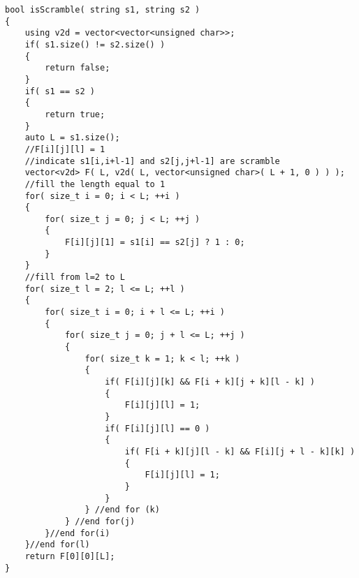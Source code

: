 \begin{lstlisting}[style=customc, caption={Dynamic Programming}]
bool isScramble( string s1, string s2 )
{
    using v2d = vector<vector<unsigned char>>;
    if( s1.size() != s2.size() )
    {
        return false;
    }
    if( s1 == s2 )
    {
        return true;
    }
    auto L = s1.size();
    //F[i][j][l] = 1
    //indicate s1[i,i+l-1] and s2[j,j+l-1] are scramble
    vector<v2d> F( L, v2d( L, vector<unsigned char>( L + 1, 0 ) ) );
    //fill the length equal to 1
    for( size_t i = 0; i < L; ++i )
    {
        for( size_t j = 0; j < L; ++j )
        {
            F[i][j][1] = s1[i] == s2[j] ? 1 : 0;
        }
    }
    //fill from l=2 to L
    for( size_t l = 2; l <= L; ++l )
    {
        for( size_t i = 0; i + l <= L; ++i )
        {
            for( size_t j = 0; j + l <= L; ++j )
            {
                for( size_t k = 1; k < l; ++k )
                {
                    if( F[i][j][k] && F[i + k][j + k][l - k] )
                    {
                        F[i][j][l] = 1;
                    }
                    if( F[i][j][l] == 0 )
                    {
                        if( F[i + k][j][l - k] && F[i][j + l - k][k] )
                        {
                            F[i][j][l] = 1;
                        }
                    }
                } //end for (k)
            } //end for(j)
        }//end for(i)
    }//end for(l)
    return F[0][0][L];
}
\end{lstlisting}